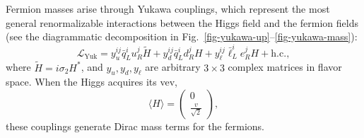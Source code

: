 Fermion masses arise through Yukawa couplings, which represent the most general renormalizable interactions between the Higgs field and the fermion fields (see the diagrammatic decomposition in Fig.~\ref{fig-yukawa-up}–\ref{fig-yukawa-mass}):
\begin{equation}
    \mathcal{L}_{\text{Yuk}} = y_{u}^{ij} \bar{q}_{L}^{i} u_{R}^{j} \tilde{H} + y_{d}^{ij} \bar{q}_{L}^{i} d_{R}^{j} H + y_{\ell}^{ij} \bar{\ell}_L^{i} e_{R}^{j} H + \text{h.c.},
\end{equation}
where $\tilde{H} = i\sigma_2 H^*$, and $y_{u}, y_{d}, y_{\ell}$ are arbitrary $3 \times 3$ complex matrices in flavor space. When the Higgs acquires its vev, 
\begin{equation}
		\langle H \rangle = \begin{pmatrix} 0 \\ \frac{v}{\sqrt{2}} \end{pmatrix},
\end{equation}
these couplings generate Dirac mass terms for the fermions.

